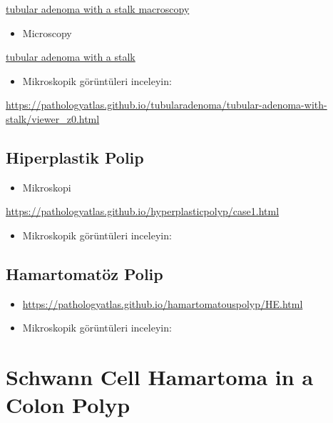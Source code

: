\documentclass[
  letterpaper,
  DIV=11,
  numbers=noendperiod]{scrreprt}
\providecommand{\tightlist}{%
  \setlength{\itemsep}{0pt}\setlength{\parskip}{0pt}}
\begin{document}
\href{https://pathologyatlas.github.io/tubularadenoma/tubular-adenoma-with-stalk-macroscopy.jpg}{tubular
adenoma with a stalk macroscopy}

\begin{itemize}
\tightlist
\item
  Microscopy
\end{itemize}

\href{https://pathologyatlas.github.io/tubularadenoma/tubular-adenoma-with-stalk.jpeg}{tubular
adenoma with a stalk}

\begin{itemize}
\tightlist
\item
  Mikroskopik görüntüleri inceleyin:
\end{itemize}

\url{https://pathologyatlas.github.io/tubularadenoma/tubular-adenoma-with-stalk/viewer_z0.html}

\hypertarget{hiperplastik-polip}{%
\section{Hiperplastik Polip}\label{hiperplastik-polip}}

\begin{itemize}
\tightlist
\item
  Mikroskopi
\end{itemize}

\url{https://pathologyatlas.github.io/hyperplasticpolyp/case1.html}

\begin{itemize}
\tightlist
\item
  Mikroskopik görüntüleri inceleyin:
\end{itemize}

\hypertarget{hamartomatuxf6z-polip-1}{%
\section{Hamartomatöz Polip}\label{hamartomatuxf6z-polip-1}}

\begin{itemize}
\item
  \url{https://pathologyatlas.github.io/hamartomatouspolyp/HE.html}
\item
  Mikroskopik görüntüleri inceleyin:
\end{itemize}

\hypertarget{schwann-cell-hamartoma-in-a-colon-polyp-1}{%
\chapter{Schwann Cell Hamartoma in a Colon
Polyp}\label{schwann-cell-hamartoma-in-a-colon-polyp-1}}
\end{document}
